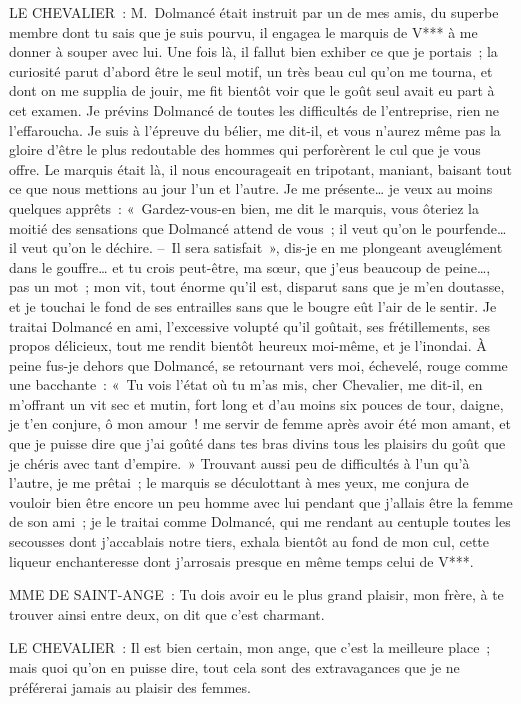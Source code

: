 \documentclass[french,twoside]{book} %
\begin{document}
LE CHEVALIER : M. Dolmancé était instruit par un de mes amis, du superbe membre dont tu sais que je suis pourvu, il engagea le marquis de V*** à me donner à souper avec lui. Une fois là, il fallut bien exhiber ce que je portais ; la curiosité parut d’abord être le seul motif, un très beau cul qu’on me tourna, et dont on me supplia de jouir, me fit bientôt voir que le goût seul avait eu part à cet examen. Je prévins Dolmancé de toutes les difficultés de l’entreprise, rien ne l’effaroucha. Je suis à l’épreuve du bélier, me dit-il, et vous n’aurez même pas la gloire d’être le plus redoutable des hommes qui perforèrent le cul que je vous offre. Le marquis était là, il nous encourageait en tripotant, maniant, baisant tout ce que nous mettions au jour l’un et l’autre. Je me présente… je veux au moins quelques apprêts : « Gardez-vous-en bien, me dit le marquis, vous ôteriez la moitié des sensations que Dolmancé attend de vous ; il veut qu’on le pourfende… il veut qu’on le déchire. – Il sera satisfait », dis-je en me plongeant aveuglément dans le gouffre… et tu crois peut-être, ma sœur, que j’eus beaucoup de peine…, pas un mot ; mon vit, tout énorme qu’il est, disparut sans que je m’en doutasse, et je touchai le fond de ses entrailles sans que le bougre eût l’air de le sentir. Je traitai Dolmancé en ami, l’excessive volupté qu’il goûtait, ses frétillements, ses propos délicieux, tout me rendit bientôt heureux moi-même, et je l’inondai. À peine fus-je dehors que Dolmancé, se retournant vers moi, échevelé, rouge comme une bacchante : « Tu vois l’état où tu m’as mis, cher Chevalier, me dit-il, en m’offrant un vit sec et mutin, fort long et d’au moins six pouces de tour, daigne, je t’en conjure, ô mon amour ! me servir de femme après avoir été mon amant, et que je puisse dire que j’ai goûté dans tes bras divins tous les plaisirs du goût que je chéris avec tant d’empire. » Trouvant aussi peu de difficultés à l’un qu’à l’autre, je me prêtai ; le marquis se déculottant à mes yeux, me conjura de vouloir bien être encore un peu homme avec lui pendant que j’allais être la femme de son ami ; je le traitai comme Dolmancé, qui me rendant au centuple toutes les secousses dont j’accablais notre tiers, exhala bientôt au fond de mon cul, cette liqueur enchanteresse dont j’arrosais presque en même temps celui de V***.\par
MME DE SAINT-ANGE : Tu dois avoir eu le plus grand plaisir, mon frère, à te trouver ainsi entre deux, on dit que c’est charmant.\par
LE CHEVALIER : Il est bien certain, mon ange, que c’est la meilleure place ; mais quoi qu’on en puisse dire, tout cela sont des extravagances que je ne préférerai jamais au plaisir des femmes.\par
\end{document}
